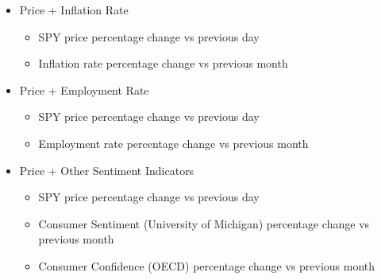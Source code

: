 \begin{itemize}
\begin{itemize}
    \end{itemize}
    \item Price + Inflation Rate
    \begin{itemize}
        \item SPY price percentage change vs previous day
        \item Inflation rate percentage change vs previous month
    \end{itemize}
    \item Price + Employment Rate
    \begin{itemize}
        \item SPY price percentage change vs previous day
        \item Employment rate percentage change vs previous month
    \end{itemize}
    \item Price + Other Sentiment Indicators
    \begin{itemize}
        \item SPY price percentage change vs previous day
        \item Consumer Sentiment (University of Michigan) percentage change vs previous month
        \item Consumer Confidence (OECD) percentage change vs previous month
    \end{itemize}
\end{itemize}